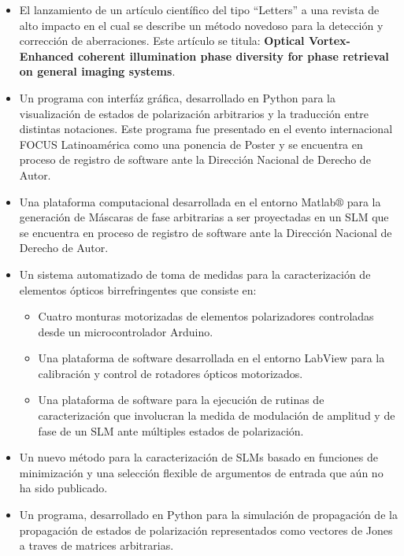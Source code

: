 \begin{itemize}
\item El lanzamiento de un artículo científico del tipo ``Letters'' a una revista de alto
  impacto en el cual se describe un método novedoso para la detección
  y corrección de aberraciones. Este artículo se titula: \textbf{Optical Vortex-Enhanced coherent illumination phase diversity for phase retrieval on general imaging systems}.
  
\item Un programa con interfáz gráfica, desarrollado en Python para la
  visualización de estados de polarización arbitrarios y la traducción entre distintas
  notaciones. Este programa fue presentado en el evento internacional
  FOCUS Latinoamérica como una ponencia de Poster y se encuentra en proceso de registro de
  software ante la Dirección Nacional de Derecho de Autor. 
\item Una plataforma computacional desarrollada en el entorno
  Matlab$\circledR$ para la generación de Máscaras de fase arbitrarias
  a ser proyectadas en un SLM que se encuentra en proceso de registro
  de software ante la Dirección Nacional de Derecho de Autor. 
\item Un sistema automatizado de toma de medidas para la
  caracterización de elementos ópticos birrefringentes que consiste
  en:
  \begin{itemize}
  \item  Cuatro monturas motorizadas de elementos polarizadores
    controladas desde un microcontrolador Arduino.
   \item Una plataforma de software desarrollada en el entorno LabView
     para la calibración y control de rotadores ópticos motorizados.
   \item Una plataforma de software para la ejecución de rutinas de
     caracterización que involucran la medida de modulación de
     amplitud y de fase de un SLM ante múltiples estados de polarización.
  \end{itemize}
\item Un nuevo método para la caracterización de SLMs basado en
  funciones de minimización y una selección flexible de argumentos de
  entrada que aún no ha sido publicado.
\item Un programa, desarrollado en Python para la
  simulación de propagación de la propagación de estados de
  polarización representados como vectores de Jones a traves de
  matrices arbitrarias.  
\end{itemize}

